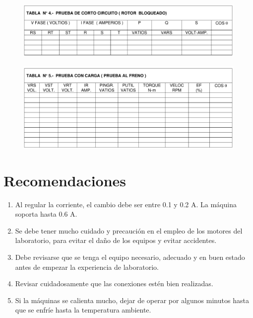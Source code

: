 \documentclass[a4paper,12pt]{article}
\begin{document}
\begin{enumerate}
\begin{figure}[H]
    \end{figure}
    \begin{figure}[H]
        \centering
        \includegraphics[scale = 0.4]{t4.png}
    \end{figure}
    \begin{figure}[H]
        \centering
        \includegraphics[scale = 0.4]{t5.png}
    \end{figure}
\end{enumerate}
\newpage
\section{Recomendaciones}
\begin{enumerate}
    \item Al regular la corriente, el cambio debe ser entre 0.1 y 0.2 A. La máquina soporta hasta 0.6 A.
    \item Se debe tener mucho cuidado y precaución en el empleo de los motores del laboratorio, para evitar el daño de los equipos y evitar accidentes.
    \item Debe revisarse que se tenga el equipo necesario, adecuado y en buen estado antes de empezar la experiencia de laboratorio.
    \item Revisar cuidadosamente que las conexiones estén bien realizadas.
    \item Si la máquinas se calienta mucho, dejar de operar por algunos minutos hasta que se enfríe hasta la temperatura ambiente.
\end{enumerate}
\end{document}
